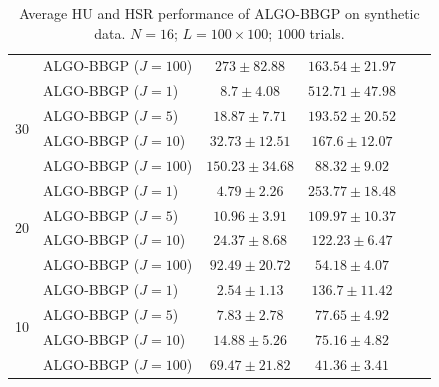 \begin{table}[h]
\begin{adjustbox}{max width=\textwidth}
\begin{tabular}{|c|l|c|c|c|c|}
                    & ALGO-BBGP ($J=100$)          & $273      \pm 82.88$  & $163.54   \pm 21.97$  \tabularnewline \cline{1-4}
\multirow{4}{*}{30} & ALGO-BBGP ($J=1$)            & $8.7      \pm 4.08$   & $512.71   \pm 47.98$ \tabularnewline
                    & ALGO-BBGP ($J=5$)            & $18.87    \pm 7.71$   & $193.52   \pm 20.52$ \tabularnewline
                    & ALGO-BBGP ($J=10$)           & $32.73    \pm 12.51$  & $167.6    \pm 12.07$ \tabularnewline
                    & ALGO-BBGP ($J=100$)          & $150.23   \pm 34.68$  & $88.32    \pm 9.02$  \tabularnewline \cline{1-4}
\multirow{4}{*}{20} & ALGO-BBGP ($J=1$)            & $4.79     \pm 2.26$   & $253.77   \pm 18.48$ \tabularnewline
                    & ALGO-BBGP ($J=5$)            & $10.96    \pm 3.91$   & $109.97   \pm 10.37$ \tabularnewline
                    & ALGO-BBGP ($J=10$)           & $24.37    \pm 8.68$   & $122.23   \pm 6.47$  \tabularnewline
                    & ALGO-BBGP ($J=100$)          & $92.49    \pm 20.72$  & $54.18    \pm 4.07$  \tabularnewline \cline{1-4}
\multirow{4}{*}{10} & ALGO-BBGP ($J=1$)            & $2.54     \pm 1.13$   & $136.7    \pm 11.42$ \tabularnewline
                    & ALGO-BBGP ($J=5$)            & $7.83     \pm 2.78$   & $77.65    \pm 4.92$  \tabularnewline
                    & ALGO-BBGP ($J=10$)           & $14.88    \pm 5.26$   & $75.16    \pm 4.82$  \tabularnewline
                    & ALGO-BBGP ($J=100$)          & $69.47    \pm 21.82$  & $41.36    \pm 3.41$  \tabularnewline \cline{1-4}
\end{tabular}                                                                                                                                                  
\end{adjustbox}                                                                                                                                                
\caption{Average HU and HSR performance of ALGO-BBGP on synthetic data.                                                                                        
         $N = 16$; $L = 100 \times 100$; $1000$ trials.}                                                                                            
\label{table:results_full_BBGP_MO16}
\end{table}

